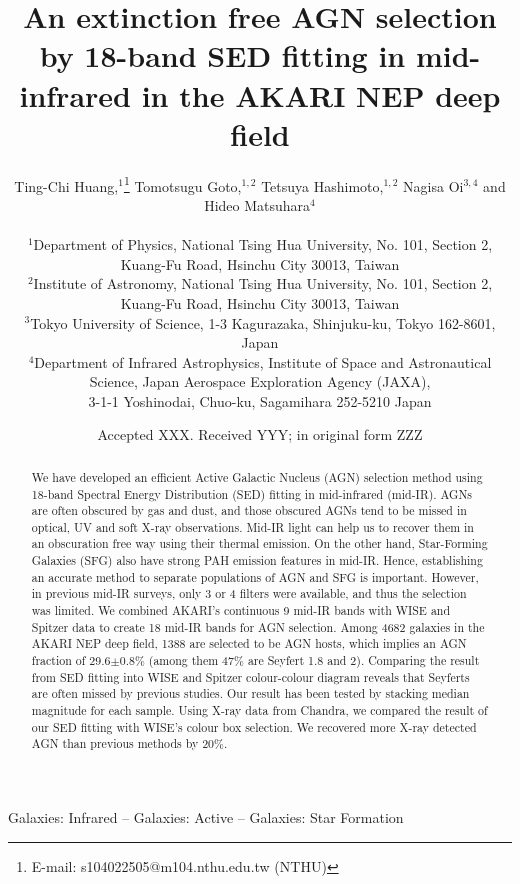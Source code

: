 \documentclass[a4paper,fleqn,usenatbib]{mnras}
\title[An extinction free AGN selection by 18-band SED fitting in mid-infrared in the AKARI NEP deep field]{An extinction free AGN selection by 18-band SED fitting in mid-infrared in the AKARI NEP deep field}
\author[Ting-Chi Huang]{Ting-Chi Huang,$^{1}$\thanks{E-mail: s104022505@m104.nthu.edu.tw (NTHU)}
Tomotsugu Goto,$^{1,2}$ Tetsuya Hashimoto,$^{1,2}$ Nagisa Oi$^{3,4}$
\newauthor and Hideo Matsuhara$^4$ 
\\
\\
$^{1}$Department of Physics, National Tsing Hua University, No. 101, Section 2, Kuang-Fu Road, Hsinchu City 30013, Taiwan\\
$^{2}$Institute of Astronomy, National Tsing Hua University, No. 101, Section 2, Kuang-Fu Road, Hsinchu City 30013, Taiwan\\
$^{3}$Tokyo University of Science, 1-3 Kagurazaka, Shinjuku-ku, Tokyo 162-8601, Japan\\
$^{4}$Department of Infrared Astrophysics, Institute of Space and Astronautical Science, Japan Aerospace Exploration Agency (JAXA), \\
3-1-1 Yoshinodai, Chuo-ku, Sagamihara 252-5210 Japan
}
\date{Accepted XXX. Received YYY; in original form ZZZ}
\begin{document}
\label{firstpage}
\pagerange{\pageref{firstpage}--\pageref{lastpage}}
\maketitle

\begin{abstract}
We have developed an efficient Active Galactic Nucleus (AGN) selection method using 18-band Spectral Energy Distribution (SED) fitting in mid-infrared (mid-IR). AGNs are often obscured by gas and dust, and those obscured AGNs tend to be missed in optical, UV and soft X-ray observations. Mid-IR light can help us to recover them in an obscuration free way using their thermal emission. On the other hand, Star-Forming Galaxies (SFG) also have strong PAH emission features in mid-IR. Hence, establishing an accurate method to separate populations of AGN and SFG is important. However, in previous mid-IR surveys, only 3 or 4 filters were available, and thus the selection was limited. We combined AKARI's continuous 9 mid-IR bands with WISE and Spitzer data to create 18 mid-IR bands for AGN selection. Among 4682 galaxies in the AKARI NEP deep field, 1388 are selected to be AGN hosts, which implies an AGN fraction of 29.6$\pm$0.8$\%$ (among them 47$\%$ are Seyfert 1.8 and 2). Comparing the result from SED fitting into WISE and Spitzer colour-colour diagram reveals that Seyferts are often missed by previous studies. Our result has been tested by stacking median magnitude for each sample. Using X-ray data from Chandra, we compared the result of our SED fitting with WISE's colour box selection. We recovered more X-ray detected AGN than previous methods by 20$\%$. 


\end{abstract}

\begin{keywords}
Galaxies: Infrared -- Galaxies: Active -- Galaxies: Star Formation
\end{keywords}


\end{document}
